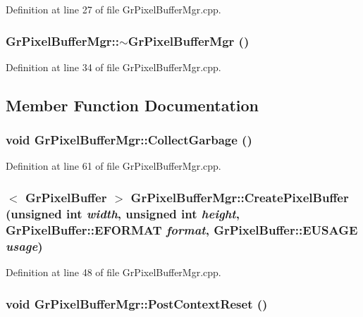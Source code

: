 Definition at line 27 of file GrPixelBufferMgr.cpp.\hypertarget{class_gr_pixel_buffer_mgr_89b7d9903422d9913f02cd5fd98c4fca}{
\subsubsection[{$\sim$GrPixelBufferMgr}]{\setlength{\rightskip}{0pt plus 5cm}GrPixelBufferMgr::$\sim$GrPixelBufferMgr ()}}
\label{class_gr_pixel_buffer_mgr_89b7d9903422d9913f02cd5fd98c4fca}




Definition at line 34 of file GrPixelBufferMgr.cpp.

\subsection{Member Function Documentation}
\hypertarget{class_gr_pixel_buffer_mgr_7175ec10dbcfa1340ee9b991384030fc}{
\subsubsection[{CollectGarbage}]{\setlength{\rightskip}{0pt plus 5cm}void GrPixelBufferMgr::CollectGarbage ()}}
\label{class_gr_pixel_buffer_mgr_7175ec10dbcfa1340ee9b991384030fc}




Definition at line 61 of file GrPixelBufferMgr.cpp.\hypertarget{class_gr_pixel_buffer_mgr_7d2027e6a200df97e492a2e8de57f309}{
\subsubsection[{CreatePixelBuffer}]{$<$ {\bf GrPixelBuffer} $>$ GrPixelBufferMgr::CreatePixelBuffer (unsigned int {\em width}, \/  unsigned int {\em height}, \/  {\bf GrPixelBuffer::EFORMAT} {\em format}, \/  {\bf GrPixelBuffer::EUSAGE} {\em usage})}}
\label{class_gr_pixel_buffer_mgr_7d2027e6a200df97e492a2e8de57f309}




Definition at line 48 of file GrPixelBufferMgr.cpp.\hypertarget{class_gr_pixel_buffer_mgr_f038b8a6efbdf78068071794d2ed565d}{
\subsubsection[{PostContextReset}]{\setlength{\rightskip}{0pt plus 5cm}void GrPixelBufferMgr::PostContextReset ()}}
\label{class_gr_pixel_buffer_mgr_f038b8a6efbdf78068071794d2ed565d}




